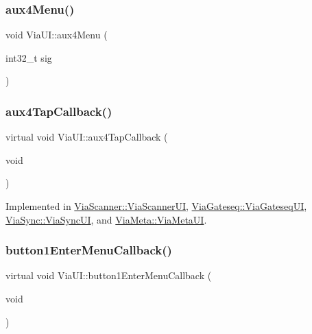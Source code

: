 \mbox{\label{class_via_u_i_a9e082c0b454b4fe05a9fc48ca922f9b5}} 
\subsubsection{\texorpdfstring{aux4\+Menu()}{aux4Menu()}}
{\footnotesize\ttfamily void Via\+U\+I\+::aux4\+Menu (\begin{DoxyParamCaption}\item[{int32\+\_\+t}]{sig }\end{DoxyParamCaption})}

\mbox{\label{class_via_u_i_a0a43c527f027d11b266080d8cacb1d65}} 
\subsubsection{\texorpdfstring{aux4\+Tap\+Callback()}{aux4TapCallback()}}
{\footnotesize\ttfamily virtual void Via\+U\+I\+::aux4\+Tap\+Callback (\begin{DoxyParamCaption}\item[{void}]{ }\end{DoxyParamCaption})\hspace{0.3cm}{\ttfamily [pure virtual]}}



Implemented in \mbox{\hyperlink{class_via_scanner_1_1_via_scanner_u_i_a8c20c03c838257da356f0071dfcbfd36}{Via\+Scanner\+::\+Via\+Scanner\+UI}}, \mbox{\hyperlink{class_via_gateseq_1_1_via_gateseq_u_i_af12df5bd6d6bb9b069e8c410fcae7473}{Via\+Gateseq\+::\+Via\+Gateseq\+UI}}, \mbox{\hyperlink{class_via_sync_1_1_via_sync_u_i_a1cf7ef02457d9f7887da0721799aadc0}{Via\+Sync\+::\+Via\+Sync\+UI}}, and \mbox{\hyperlink{class_via_meta_1_1_via_meta_u_i_ad8e6300990d654091672b0f94a9b47d8}{Via\+Meta\+::\+Via\+Meta\+UI}}.

\mbox{\label{class_via_u_i_ae00249c10af94437c357222328a56f82}} 
\subsubsection{\texorpdfstring{button1\+Enter\+Menu\+Callback()}{button1EnterMenuCallback()}}
{\footnotesize\ttfamily virtual void Via\+U\+I\+::button1\+Enter\+Menu\+Callback (\begin{DoxyParamCaption}\item[{void}]{ }\end{DoxyParamCaption})\hspace{0.3cm}{\ttfamily [pure virtual]}}



